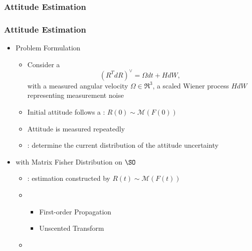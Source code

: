 
\subsubsection[Estimation]{Attitude Estimation}
\begin{frame}
\frametitle{Attitude Estimation}

\begin{itemize}
\item {} Problem Formulation
	\begin{itemize}
	\item Consider a 
	\[ (R^T dR)^\vee = \Omega dt + H dW,\]
	with a measured angular velocity $\Omega\in\Re^3$, a scaled Wiener process $HdW$ representing measurement noise
	\item Initial attitude follows a : $R(0)\sim\mathcal{M}(F(0))$
	\item Attitude is measured repeatedly
	\item {}: determine the current distribution of the attitude uncertainty
	\end{itemize}
\vspace*{0.3cm}\pause
\item {} with Matrix Fisher Distribution on $\SO$
	\begin{itemize}
	\item {}: estimation constructed by $R(t)\sim\mathcal{M}(F(t))$
	\item {}
		\begin{itemize}
		\item First-order Propagation
		\item Unscented Transform
		\end{itemize}
	\item {}
	\end{itemize}
\end{itemize}
\end{frame}

